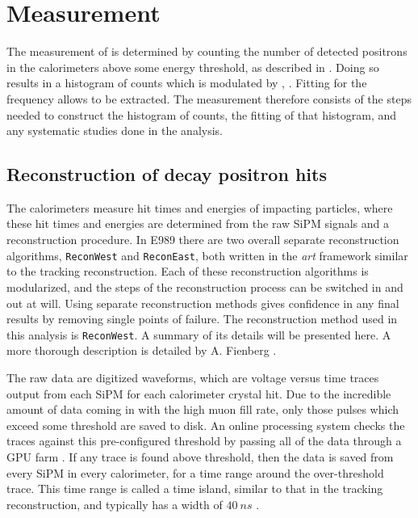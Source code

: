 
\thispagestyle{myheadings}

\graphicspath{{Body/Figures/WaGeneral/Temporary/}{Body/Figures/WaGeneral/Reconstruction/}{Body/Figures/WaGeneral/Histogramming/}{Body/Figures/WaGeneral/Pileup/}{Body/Figures/WaGeneral/Pileup/TimeAndEnergySpectra/}{Body/Figures/RatioAnalysis/}{Body/Figures/RatioAnalysis/MethodOverview/}}

\chapter{\texorpdfstring{\wa}{wa} Measurement}
\label{chapter:wa}


The measurement of \wa is determined by counting the number of detected positrons in the calorimeters above some energy threshold, as described in . Doing so results in a histogram of counts which is modulated by \wa, . Fitting for the frequency allows \wa to be extracted. The \wa measurement therefore consists of the steps needed to construct the histogram of counts, the fitting of that histogram, and any systematic studies done in the analysis. 


\section{Reconstruction of decay positron hits}
\label{sec:ReconWest}


The calorimeters measure hit times and energies of impacting particles, where these hit times and energies are determined from the raw SiPM signals and a reconstruction procedure. In E989 there are two overall separate reconstruction algorithms, \texttt{ReconWest} and \texttt{ReconEast}, both written in the \textit{art} framework similar to the tracking reconstruction. Each of these reconstruction algorithms is modularized, and the steps of the reconstruction process can be switched in and out at will. Using separate reconstruction methods gives confidence in any final results by removing single points of failure. The reconstruction method used in this analysis is \texttt{ReconWest}. A summary of its details will be presented here. A more thorough description is detailed by A. Fienberg \cite{AFThesis}.


The raw data are digitized waveforms, which are voltage versus time traces output from each SiPM for each calorimeter crystal hit. Due to the incredible amount of data coming in with the high muon fill rate, only those pulses which exceed some threshold are saved to disk. An online processing system checks the traces against this pre-configured threshold by passing all of the data through a GPU farm \cite{Gohn:2016shi}. If any trace is found above threshold, then the data is saved from every SiPM in every calorimeter, for a time range around the over-threshold trace. This time range is called a time island, similar to that in the tracking reconstruction, and typically has a width of $\SI{40}{ns}$ \cite{AFThesis}.


